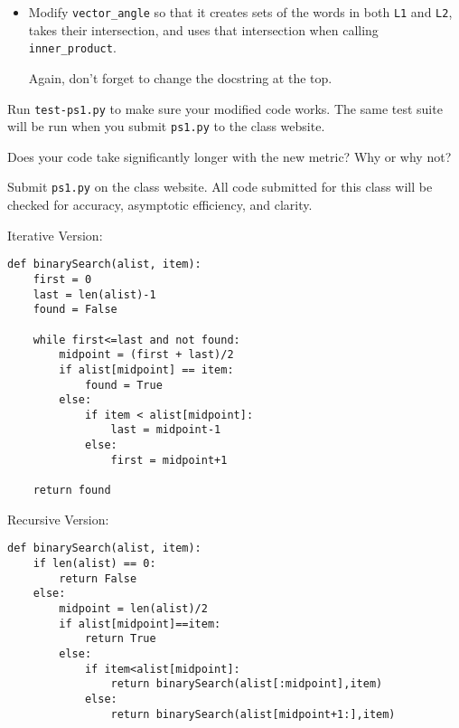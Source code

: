\documentclass[12pt,twoside]{article}
\begin{document}
\begin{enumerate}
\begin{enumerate}
\begin{itemize}
    \item Modify \texttt{vector\_angle} so that it creates sets of the
      words in both \texttt{L1} and \texttt{L2}, takes their
      intersection, and uses that intersection when calling
      \texttt{inner\_product}.
      
      Again, don't forget to change the docstring at the top.
    \end{itemize}

    Run \texttt{test-ps1.py} to make sure your modified code
    works. The same test suite will be run when you submit
    \texttt{ps1.py} to the class website.

    Does your code take significantly longer with the new metric? Why
    or why not?

    Submit \texttt{ps1.py} on the class website. All code submitted
    for this class will be checked for accuracy, asymptotic
    efficiency, and clarity.

  \end{enumerate}
\end{enumerate}

\newpage

Iterative Version:
\begin{verbatim}
def binarySearch(alist, item):
    first = 0
    last = len(alist)-1
    found = False

    while first<=last and not found:
        midpoint = (first + last)/2
        if alist[midpoint] == item:
            found = True
        else:
            if item < alist[midpoint]:
                last = midpoint-1
            else:
                first = midpoint+1

    return found
\end{verbatim}

Recursive Version:
\begin{verbatim}
def binarySearch(alist, item):
    if len(alist) == 0:
        return False
    else:
        midpoint = len(alist)/2
        if alist[midpoint]==item:
            return True
        else:
            if item<alist[midpoint]:
                return binarySearch(alist[:midpoint],item)
            else:
                return binarySearch(alist[midpoint+1:],item)
\end{verbatim}
\end{document}
